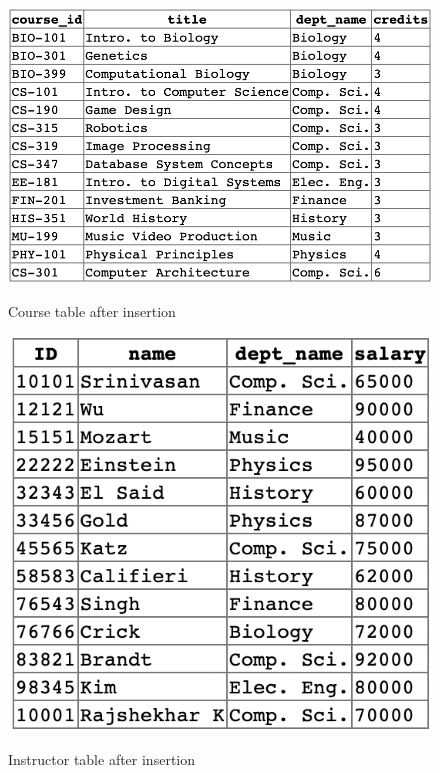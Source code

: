 \documentclass[12pt]{article}
\begin{document}
\begin{figure}[!hbt]
    \centering
    \includegraphics[scale=0.8]{screenshots/course.png}
    \label{fig:my_label1}
    \caption{Course table after insertion}
\end{figure}
\newpage

\begin{figure}[!hbt]
    \centering
    \includegraphics[scale=0.9]{screenshots/instructor.png}
    \label{fig:my_label1}
    \caption{Instructor table after insertion}
\end{figure}
\end{document}
